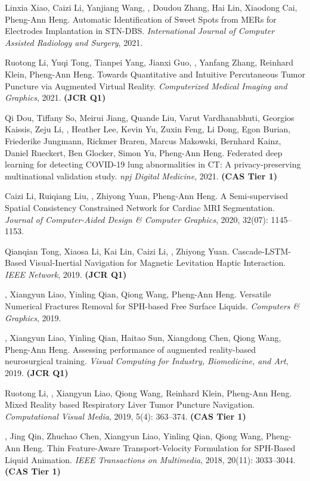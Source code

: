 \documentclass[a4paper,12pt,english]{curve}
\begin{document}
\begin{small}
\begin{publist}
\item Linxia Xiao, Caizi Li, Yanjiang Wang, \WS\CORR, Doudou Zhang, Hai Lin, Xiaodong Cai, Pheng-Ann Heng. Automatic Identification of Sweet Spots from MERs for Electrodes Implantation in STN-DBS. \emph{International Journal of Computer Assisted Radiology and Surgery}, 2021.
\item Ruotong Li, Yuqi Tong, Tianpei Yang, Jianxi Guo, \WS\CORR, Yanfang Zhang, Reinhard Klein, Pheng-Ann Heng. Towards Quantitative and Intuitive Percutaneous Tumor Puncture via Augmented Virtual Reality. \emph{Computerized Medical Imaging and Graphics}, 2021. \textbf{(JCR Q1)}
\item Qi Dou, Tiffany So, Meirui Jiang, Quande Liu, Varut Vardhanabhuti, Georgios Kaissis, Zeju Li, \WS, Heather Lee, Kevin Yu, Zuxin Feng, Li Dong, Egon Burian, Friederike Jungmann, Rickmer Braren, Marcus Makowski, Bernhard Kainz, Daniel Rueckert, Ben Glocker, Simon Yu, Pheng-Ann Heng. Federated deep learning for detecting COVID-19 lung abnormalities in CT: A privacy-preserving multinational validation study. \emph{npj Digital Medicine}, 2021. \textbf{(CAS Tier 1)}
\item Caizi Li, Ruiqiang Liu, \WS\CORR, Zhiyong Yuan, Pheng-Ann Heng. A Semi-supervised Spatial Consistency Constrained Network for Cardiac MRI Segmentation. \emph{Journal of Computer-Aided Design \& Computer Graphics}, 2020, 32(07): 1145--1153.
\item Qianqian Tong, Xiaosa Li, Kai Lin, Caizi Li, \WS\CORR, Zhiyong Yuan\CORR. Cascade-LSTM-Based Visual-Inertial Navigation for Magnetic Levitation Haptic Interaction. \emph{IEEE Network}, 2019. \textbf{(JCR Q1)}
\item \WS, Xiangyun Liao, Yinling Qian, Qiong Wang\CORR, Pheng-Ann Heng. Versatile Numerical Fractures Removal for SPH-based Free Surface Liquids. \emph{Computers \& Graphics}, 2019.
\item \WS, Xiangyun Liao, Yinling Qian, Haitao Sun, Xiangdong Chen, Qiong Wang, Pheng-Ann Heng. Assessing performance of augmented reality-based neurosurgical training. \emph{Visual Computing for Industry, Biomedicine, and Art}, 2019. \textbf{(JCR Q1)}
\item Ruotong Li\COF, \WS\COF, Xiangyun Liao, Qiong Wang\CORR, Reinhard Klein, Pheng-Ann Heng. Mixed Reality based Respiratory Liver Tumor Puncture Navigation. \emph{Computational Visual Media}, 2019, 5(4): 363--374. \textbf{(CAS Tier 1)}
\item \WS, Jing Qin, Zhuchao Chen, Xiangyun Liao\CORR, Yinling Qian, Qiong Wang\CORR, Pheng-Ann Heng. Thin Feature-Aware Transport-Velocity Formulation for SPH-Based Liquid Animation. \emph{IEEE Transactions on Multimedia}, 2018, 20(11): 3033--3044. \textbf{(CAS Tier 1)}

\end{publist}
\end{small}
\end{document}
